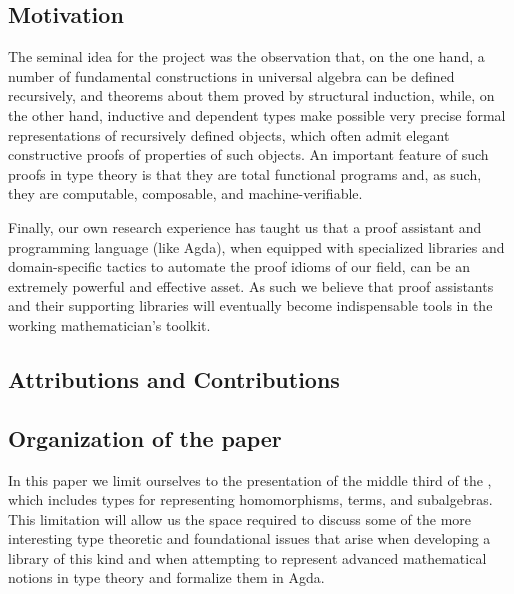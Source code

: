 \documentclass[a4paper,UKenglish,cleveref,autoref,thm-restate,12pt]{../lipics-v2021-wjd}
\begin{document}
\subsection{Motivation}\label{sec:motivation}
The seminal idea for the \agdaualib project was the observation that, on the one hand, a number of fundamental constructions in universal algebra can be defined recursively, and theorems about them proved by structural induction, while, on the other hand, inductive and dependent types make possible very precise formal representations of recursively defined objects, which often admit elegant constructive proofs of properties of such objects.  An important feature of such proofs in type theory is that they are total functional programs and, as such, they are computable, composable, and machine-verifiable.

Finally, our own research experience has taught us that a proof assistant and programming language (like Agda), when equipped with specialized libraries and domain-specific tactics to automate the proof idioms of our field, can be an extremely powerful and effective asset. As such we believe that proof assistants and their supporting libraries will eventually become indispensable tools in the working mathematician's toolkit.




\subsection{Attributions and Contributions}\label{sec:contributions}





\subsection{Organization of the paper}\label{sec:organization}

In this paper we limit ourselves to the presentation of the middle third of the \ualib, which includes types for representing homomorphisms, terms, and subalgebras. This limitation will allow us the space required to discuss some of the more interesting type theoretic and foundational issues that arise when developing a library of this kind and when attempting to represent advanced mathematical notions in type theory and formalize them in Agda.
\end{document}
